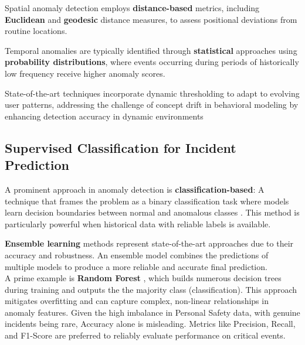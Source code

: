\documentclass[12pt,a4paper,oneside,english]{book}
\begin{document}
Spatial anomaly detection employs \textbf{distance-based} metrics, including \textbf{Euclidean} and \textbf{geodesic} distance measures, to assess positional deviations from routine locations\cite{chandola2009anomaly}.

Temporal anomalies are typically identified through \textbf{statistical} approaches using \textbf{probability distributions}, where events occurring during periods of historically low frequency receive higher anomaly scores.

State-of-the-art techniques incorporate dynamic thresholding to adapt to evolving user patterns, addressing the challenge of concept drift in behavioral modeling  by enhancing detection accuracy in dynamic environments%

\subsection{Supervised Classification for Incident Prediction}
\label{sec:supervised_classification}

A prominent approach in anomaly detection is \textbf{classification-based}: A technique that frames the problem as a binary classification task where models learn decision boundaries between normal and anomalous classes \cite{chandola2009anomaly}. This method is particularly powerful when historical data with reliable labels is available.

\textbf{Ensemble learning} methods represent state-of-the-art approaches due to their accuracy and robustness. An ensemble model combines the predictions of multiple models to produce a more reliable and accurate final prediction.
\\A prime example is \textbf{Random Forest} \cite{Breiman2001RF}, which builds numerous decision trees during training and outputs the the majority class (classification). This approach mitigates overfitting and can capture complex, non-linear relationships in anomaly features.
Given the high imbalance in Personal Safety data, with genuine incidents being rare, Accuracy alone is misleading. Metrics like Precision, Recall, and F1-Score are preferred to reliably evaluate performance on critical events.

\end{document}
